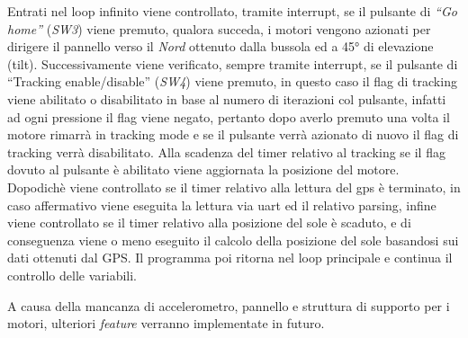 Entrati nel loop infinito viene controllato, tramite interrupt, se il
pulsante di \emph{``Go home''} (\emph{SW3}) viene premuto, qualora
succeda, i motori vengono azionati per dirigere il pannello verso il
\emph{Nord} ottenuto dalla bussola ed a 45° di elevazione (tilt).
Successivamente viene verificato, sempre tramite interrupt, se il
pulsante di ``Tracking enable/disable'' (\emph{SW4}) viene premuto, in
questo caso il flag di tracking viene abilitato o disabilitato in base
al numero di iterazioni col pulsante, infatti ad ogni pressione il flag
viene negato, pertanto dopo averlo premuto una volta il motore rimarrà
in tracking mode e se il pulsante verrà azionato di nuovo il flag di
tracking verrà disabilitato. Alla scadenza del timer relativo al
tracking se il flag dovuto al pulsante è abilitato viene aggiornata la
posizione del motore. Dopodichè viene controllato se il timer relativo
alla lettura del gps è terminato, in caso affermativo viene eseguita la
lettura via uart ed il relativo parsing, infine viene controllato se il
timer relativo alla posizione del sole è scaduto, e di conseguenza viene
o meno eseguito il calcolo della posizione del sole basandosi sui dati
ottenuti dal GPS. Il programma poi ritorna nel loop principale e
continua il controllo delle variabili.

A causa della mancanza di accelerometro, pannello e struttura di
supporto per i motori, ulteriori \emph{feature} verranno implementate in
futuro.
